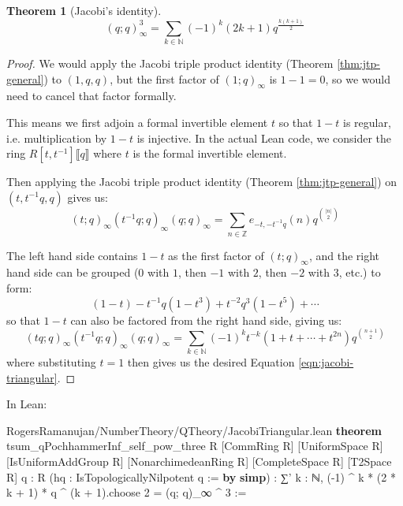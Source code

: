 \documentclass[12pt]{amsart}
\newtheorem{theorem}{Theorem}[subsection]
\theoremstyle{definition}
\theoremstyle{remark}
\numberwithin{equation}{subsection}
\newcommand{\N}{\mathbb N}
\newcommand{\ps}[1]{\llbracket #1 \rrbracket} %
\newcommand{\Z}{\mathbb Z}
\newcommand{\kw}[1]{\textcolor{keywordcolor}{\textbf{#1}}}
\newcommand{\var}[1]{\textcolor{tacticcolor}{#1}}
\newcommand{\prop}[1]{\textcolor{sortcolor}{#1}}
\newcommand{\num}[1]{\textcolor{numcolor}{#1}}
\newcommand{\imp}[1]{\textcolor{commentcolor}{\textbraceleft#1\textbraceright}}
\begin{document}
\begin{theorem}[Jacobi's identity]
\label{thm:jacobi-triangular}
\begin{equation}
\label{eqn:jacobi-triangular}
(q;q)_\infty^3 = \sum_{k \in \N} (-1)^k (2k+1) q^{\frac{k(k+1)}{2}}
\end{equation}
\end{theorem}
\begin{proof}
We would apply the Jacobi triple product identity (Theorem \ref{thm:jtp-general}) to $(1, q, q)$, but the first factor of $(1;q)_\infty$ is $1-1 = 0$, so we would need to cancel that factor formally.

This means we first adjoin a formal invertible element $t$ so that $1 - t$ is regular, i.e. multiplication by $1 - t$ is injective. In the actual Lean code, we consider the ring $R[t,t^{-1}]\ps{q}$ where $t$ is the formal invertible element.

Then applying the Jacobi triple product identity (Theorem \ref{thm:jtp-general}) on $(t, t^{-1}q, q)$ gives us:
\begin{equation}(t;q)_\infty (t^{-1}q;q)_\infty (q; q)_\infty = \sum_{n \in \Z} e_{-t,-t^{-1}q}(n) q^{\binom{|n|}{2}}\end{equation}

The left hand side contains $1-t$ as the first factor of $(t;q)_\infty$, and the right hand side can be grouped ($0$ with $1$, then $-1$ with $2$, then $-2$ with $3$, etc.) to form:
\begin{equation}(1-t)-t^{-1}q(1-t^3)+t^{-2}q^3(1-t^5)+\cdots\end{equation}
so that $1-t$ can also be factored from the right hand side, giving us:
\begin{equation}(tq;q)_\infty (t^{-1}q;q)_\infty (q;q)_\infty = \sum_{k\in\N} (-1)^k t^{-k} (1+t+\cdots+t^{2n}) q^{\binom{n+1}{2}}\end{equation}
where substituting $t=1$ then gives us the desired Equation \ref{eqn:jacobi-triangular}.
\end{proof}

In Lean:

\begin{code}{RogersRamanujan/NumberTheory/QTheory/JacobiTriangular.lean}
\kw{theorem} tsum_qPochhammerInf_self_pow_three \imp{R} [CommRing \var{R}] [UniformSpace \var{R}]
  [IsUniformAddGroup \var{R}] [NonarchimedeanRing \var{R}] [CompleteSpace \var{R}] [T2Space \var{R}]
  \imp{q : R} (\var{hq} : IsTopologicallyNilpotent \var{q} := \kw{by} \kw{simp}) :
  ∑' \var{k} : ℕ, (-\num{1}) ^ \var{k} * (\num{2} * \var{k} + \num{1}) * \var{q} ^ (\var{k} + \num{1}).\prop{choose} \num{2} = (\var{q}; \var{q})_∞ ^ \num{3} :=
\end{code}
\end{document}
